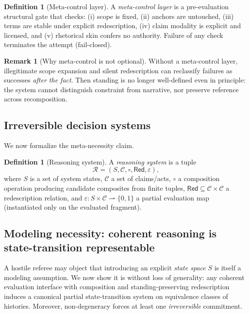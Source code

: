 \documentclass[11pt]{article}
\theoremstyle{definition}
\newtheorem{definition}[theorem]{Definition}
\newtheorem{remark}[theorem]{Remark}
\newcommand{\Red}{\mathsf{Red}}
\newcommand{\ppar}{\rightharpoonup} %
\begin{document}
\begin{definition}[Meta-control layer]
A \emph{meta-control layer} is a pre-evaluation structural gate that checks: (i) scope is fixed, (ii) anchors are untouched, (iii) terms are stable under explicit redescription, (iv) claim modality is explicit and licensed, and (v) rhetorical skin confers no authority.
Failure of any check terminates the attempt (fail-closed).
\end{definition}

\begin{remark}[Why meta-control is not optional]
Without a meta-control layer, illegitimate scope expansion and silent redescription can reclassify failures as successes \emph{after the fact}.
Then standing is no longer well-defined even in principle: the system cannot distinguish constraint from narrative, nor preserve reference across recomposition.
\end{remark}

\subsection{Irreversible decision systems}

We now formalize the meta-necessity claim.

\begin{definition}[Reasoning system]
A \emph{reasoning system} is a tuple
\[
\mathcal{R}=(S,\mathcal{C},\circ,\Red,\varepsilon),
\]
where $S$ is a set of system states, $\mathcal{C}$ a set of claims/acts, $\circ$ a composition operation producing candidate composites from finite tuples, $\Red\subseteq \mathcal{C}\times\mathcal{C}$ a redescription relation, and $\varepsilon:S\times \mathcal{C}\ppar \{0,1\}$ a partial evaluation map (instantiated only on the evaluated fragment).
\end{definition}
\subsection{Modeling necessity: coherent reasoning is state-transition representable}
\label{sec:modeling-necessity}

A hostile referee may object that introducing an explicit \emph{state space} $S$ is itself a modeling assumption.
We now show it is without loss of generality: any coherent evaluation interface with composition and standing-preserving
redescription induces a canonical partial state-transition system on equivalence classes of histories.
Moreover, non-degeneracy forces at least one \emph{irreversible} commitment.
\end{document}
